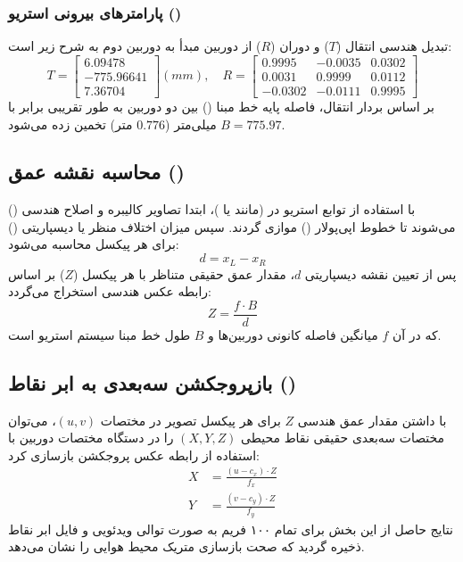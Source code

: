 \documentclass[12pt,a4paper]{article}
\begin{document}
\subsubsection*{پارامترهای بیرونی استریو ()}
تبدیل هندسی انتقال ($T$) و دوران ($R$) از دوربین مبدأ به دوربین دوم به شرح زیر است:
\begin{equation}
	T = \begin{bmatrix} 6.09478 \\ -775.96641 \\ 7.36704 \end{bmatrix} (mm), \quad
	R = \begin{bmatrix} 0.9995 & -0.0035 & 0.0302 \\ 0.0031 & 0.9999 & 0.0112 \\ -0.0302 & -0.0111 & 0.9995 \end{bmatrix}
\end{equation}
بر اساس بردار انتقال، فاصله پایه خط مبنا () بین دو دوربین به طور تقریبی برابر با $B = 775.97$ میلی‌متر ($0.776$ متر) تخمین زده می‌شود.

\subsection{محاسبه نقشه عمق ()}
با استفاده از توابع استریو در  (مانند  یا )، ابتدا تصاویر کالیبره و اصلاح هندسی () می‌شوند تا خطوط اپی‌پولار () موازی گردند. سپس میزان اختلاف منظر یا دیسپاریتی () برای هر پیکسل محاسبه می‌شود:
\begin{equation}
	d = x_L - x_R
\end{equation}
پس از تعیین نقشه دیسپاریتی $d$، مقدار عمق حقیقی متناظر با هر پیکسل ($Z$) بر اساس رابطه عکس هندسی استخراج می‌گردد:
\begin{equation}
	\label{eq:depth}
	Z = \frac{f \cdot B}{d}
\end{equation}
که در آن $f$ میانگین فاصله کانونی دوربین‌ها و $B$ طول خط مبنا سیستم استریو است.

\subsection{بازپروجکشن سه‌بعدی به ابر نقاط ()}
با داشتن مقدار عمق هندسی $Z$ برای هر پیکسل تصویر در مختصات $(u,v)$، می‌توان مختصات سه‌بعدی حقیقی نقاط محیطی $(X,Y,Z)$ را در دستگاه مختصات دوربین با استفاده از رابطه عکس پروجکشن بازسازی کرد:
\begin{align}
	X &= \frac{(u - c_x) \cdot Z}{f_x} \\
	Y &= \frac{(v - c_y) \cdot Z}{f_y}
\end{align}
نتایج حاصل از این بخش برای تمام ۱۰۰ فریم به صورت توالی ویدئویی و فایل ابر نقاط ذخیره گردید که صحت بازسازی متریک محیط هوایی را نشان می‌دهد.
\end{document}

